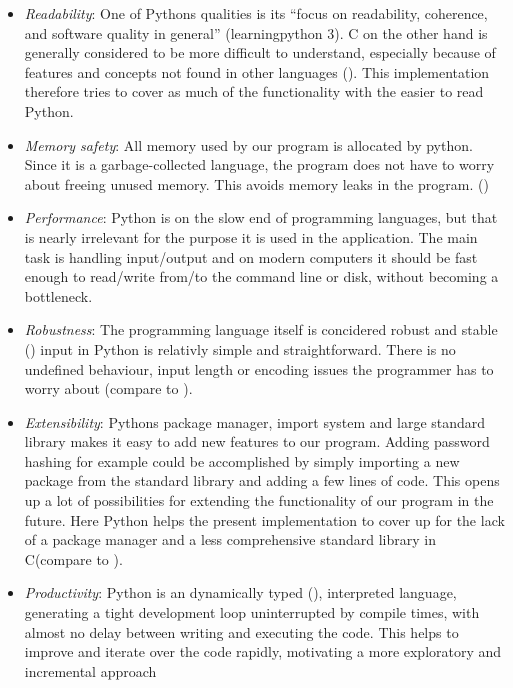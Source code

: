 \begin{itemize}

\item
  \emph{Readability}: One of Pythons qualities is its ``focus on
  readability, coherence, and software quality in general''
  (learningpython 3). C on the other hand is generally considered to be
  more difficult to understand, especially because of features and
  concepts not found in other languages (\cite[p. 5]{cmodern}). This implementation
  therefore tries to cover as much of the functionality with the easier
  to read Python.
\item
  \emph{Memory safety}: All memory used by our program is allocated by
  python. Since it is a garbage-collected language, the program does not
  have to worry about freeing unused memory. This avoids memory leaks in
  the program. (\cite[p. 18]{learningpython})
\item
  \emph{Performance}: Python is on the slow end of programming
  languages, but that is nearly irrelevant for the purpose it is used in
  the application. The main task is handling input/output and on modern
  computers it should be fast enough to read/write from/to the command
  line or disk, without becoming a bottleneck.
\item
  \emph{Robustness}: The programming language itself is concidered
  robust and stable (\cite[p. 9]{learningpython}) input in Python is relativly
  simple and straightforward. There is no undefined behaviour, input
  length or encoding issues the programmer has to worry about (compare
  to \cite{scanf}).
\item
  \emph{Extensibility}: Pythons package manager, import system and large
  standard library makes it easy to add new features to our program.
  Adding password hashing for example could be accomplished by simply
  importing a new package from the standard library and adding a few
  lines of code. This opens up a lot of possibilities for extending the
  functionality of our program in the future. Here Python helps the
  present implementation to cover up for the lack of a package manager
  and a less comprehensive standard library in C(compare
  \cite{cbib} to \cite{pybib}).
\item
  \emph{Productivity}: Python is an dynamically typed (\cite[p. 9]{learningpython}), interpreted language, generating a tight development loop
  uninterrupted by compile times, with almost no delay between writing
  and executing the code. This helps to improve and iterate over the
  code rapidly, motivating a more exploratory and incremental approach

\end{itemize}
